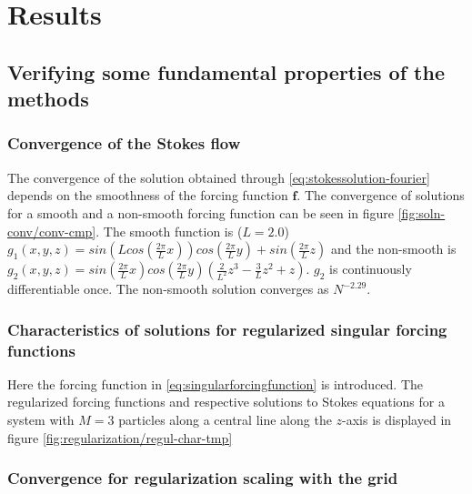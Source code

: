 \documentclass[a4paper,
twoside=false,abstract=false,numbers=noenddot,
titlepage=false,headings=small,parskip=half,version=last]{scrartcl}
\begin{document}
\section{Results}

\subsection{Verifying some fundamental properties of the methods}

\subsubsection{Convergence of the Stokes flow}
The convergence of the solution obtained through \eqref{eq:stokessolution-fourier} depends on the smoothness of the forcing function $\mathbf{f}$.
The convergence of solutions for a smooth and a non-smooth forcing function can be seen in figure \ref{fig:soln-conv/conv-cmp}.
The smooth function is ($L=2.0$) $g_1(x,y,z) = sin(Lcos(\frac{2\pi}{L}x))cos(\frac{2\pi}{L}y) + sin(\frac{2\pi}{L}z)$ and the non-smooth is $g_2(x,y,z) = sin(\frac{2\pi}{L}x)cos(\frac{2\pi}{L}y)(\frac{2}{L^2}z^3 - \frac{3}{L} z^2 + z)$. $g_2$ is continuously differentiable once.
The non-smooth solution converges as $N^{-2.29}$.

\subsubsection{Characteristics of solutions for regularized singular forcing functions}
Here the forcing function in \eqref{eq:singularforcingfunction} is introduced. The regularized forcing functions and respective solutions to Stokes equations for a system with $M=3$ particles along a central line along the $z$-axis is displayed in figure \ref{fig:regularization/regul-char-tmp}

\subsubsection{Convergence for regularization scaling with the grid}
\end{document}

